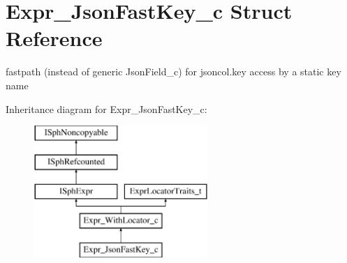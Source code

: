 \hypertarget{structExpr__JsonFastKey__c}{\section{Expr\-\_\-\-Json\-Fast\-Key\-\_\-c Struct Reference}
\label{structExpr__JsonFastKey__c}
}


fastpath (instead of generic Json\-Field\-\_\-c) for jsoncol.\-key access by a static key name  


Inheritance diagram for Expr\-\_\-\-Json\-Fast\-Key\-\_\-c\-:\begin{figure}[H]
\begin{center}
\leavevmode
\includegraphics[height=5.000000cm]{structExpr__JsonFastKey__c}
\end{center}
\end{figure}
